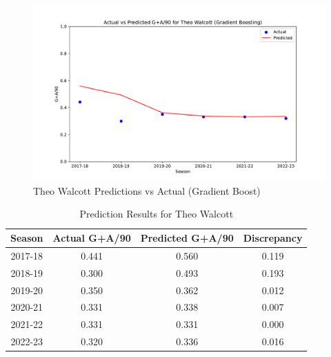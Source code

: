 \documentclass[12pt]{article}
\begin{document}
\begin{figure}[H]
  \centering
  \includegraphics[width=1\textwidth]{GradBoost_Walcott.pdf}
  \caption{Theo Walcott Predictions vs Actual (Gradient Boost)}
  \label{fig:Walcott_graph}
  \end{figure}



\begin{table}[h]
  \centering
  \begin{tabular}{|c|c|c|c|}
  \hline
  \textbf{Season} & \textbf{Actual G+A/90} & \textbf{Predicted G+A/90} & \textbf{Discrepancy} \\
  \hline
  2017-18 & 0.441 & 0.560 & 0.119 \\
  2018-19 & 0.300 & 0.493 & 0.193 \\
  2019-20 & 0.350 & 0.362 & 0.012 \\
  2020-21 & 0.331 & 0.338 & 0.007 \\
  2021-22 & 0.331 & 0.331 & 0.000 \\
  2022-23 & 0.320 & 0.336 & 0.016 \\
  \hline
  \end{tabular}
  \caption{Prediction Results for Theo Walcott}
  \label{tab:walcott_prediction_results}
\end{table}


\end{document}
